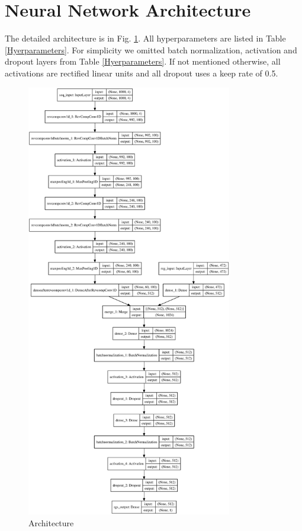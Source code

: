 \documentclass{article}
\begin{document}
\section{Neural Network Architecture}
\label{sec: Neural Network Architecture}
The detailed architecture is in Fig. \ref{fig:Architecture}. All hyperparameters are listed in Table \ref{Hyerparameters}. For simplicity we omitted batch normalization, activation and dropout layers from Table \ref{Hyerparameters}. If not mentioned otherwise, all activations are rectified linear units and all dropout uses a keep rate of 0.5. 


\begin{figure}
\centering
\includegraphics[width=0.8\textwidth]{fig/model.eps}
\caption{Architecture}
\label{fig:Architecture}
\end{figure}
\end{document}
